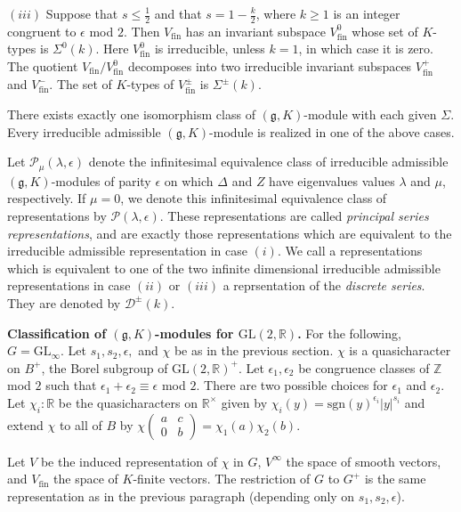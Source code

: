 \documentclass[12pt, letterpaper, twoside]
{article}
\newcommand{\Z}{{\mathbb Z}} %
\newcommand{\R}{{\mathbb R}} %
\newcommand{\GL}{{\text{GL}}} %
\newcommand{\gI}{\mathfrak{g}} %
\begin{document}
$(iii)$ Suppose that $s \leq \frac{1}{2}$ and that $s = 1 - \frac{k}{2}$, where
$k \geq 1$ is an integer congruent to $\epsilon$ mod $2$. Then $V_{\text{fin}}$
has an invariant subspace $V_\text{fin}^0$ whose set of $K$-types is
$\Sigma^0(k)$. Here $V_{\text{fin}}^0$ is irreducible, unless $k = 1$, in which
case it is zero. The quotient $V_{\text{fin}}/V_{\text{fin}}^0$ decomposes into
two irreducible invariant subspaces $V_{\text{fin}}^+$ and $V_{\text{fin}}^-$.
The set of $K$-types of $V_{\text{fin}}^\pm$ is $\Sigma^{\pm}(k)$.

There exists exactly one isomorphism class of $(\gI, K)$-module with each given
$\Sigma$. Every irreducible admissible $(\gI, K)$-module is realized in one of
the above cases.

Let $\mathcal{P}_\mu(\lambda, \epsilon)$ denote the infinitesimal equivalence
class of irreducible admissible $(\gI, K)$-modules of parity $\epsilon$ on which
$\Delta$ and $Z$ have eigenvalues values $\lambda$ and $\mu$, respectively. If
$\mu = 0$, we denote this infinitesimal equivalence class of representations by
$\mathcal{P}(\lambda, \epsilon)$. These representations are called
\textit{principal series representations}, and are exactly those representations
which are equivalent to the irreducible admissible representation in case $(i)$.
We call a representations which is equivalent to one of the two infinite
dimensional irreducible admissible representations in case $(ii)$ or $(iii)$ a
reprsentation of the \textit{discrete series}. They are denoted by
$\mathcal{D}^\pm(k)$.



\textbf{Classification of $(\gI, K)$-modules for $\GL(2, \R)$.} For the
following, $G = \GL_\infty$. Let $s_1, s_2, \epsilon,$ and $\chi$ be as in the
previous section. $\chi$ is a quasicharacter on $B^+$, the Borel subgroup of
$\GL(2, \R)^+$. Let $\epsilon_1, \epsilon_2$ be congruence classes of $\Z$ mod
$2$ such that $\epsilon_1 + \epsilon_2 \equiv \epsilon$ mod $2$. There are two
possible choices for $\epsilon_1$ and $\epsilon_2$. Let $\chi_i : \R$ be the
quasicharacters on $\R^\times$ given by $\chi_i(y) =
\text{sgn}(y)^{\epsilon_i}|y|^{s_i}$ and extend $\chi$ to all of $B$ by $\chi
\begin{pmatrix} a & c \\ 0 & b\end{pmatrix} = \chi_1(a)\chi_2(b)$.

Let $V$ be the induced representation of $\chi$ in $G$, $V^\infty$ the space of
smooth vectors, and $V_{\text{fin}}$ the space of $K$-finite vectors. The
restriction of $G$ to $G^+$ is the same representation as in the previous
paragraph (depending only on $s_1, s_2, \epsilon$).
\end{document}
